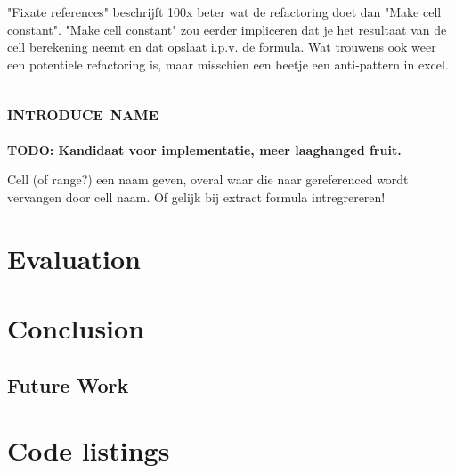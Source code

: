 \documentclass[12pt,a4paper,onecolumn,oneside,parskip]{memoir}
\newcommand{\todo}[1]{\textbf{TODO: #1}}
\newcommand{\rf}[1]{\textsc{\lowercase{#1}}}
\begin{document}
"Fixate references" beschrijft 100x beter wat de refactoring doet dan "Make cell constant". "Make cell constant" zou eerder impliceren dat je het resultaat van de cell berekening neemt en dat opslaat i.p.v. de formula. Wat trouwens ook weer een potentiele refactoring is, maar misschien een beetje een anti-pattern in excel.

\section{\rf{Introduce name}}

\todo{Kandidaat voor implementatie, meer laaghanged fruit.}

Cell (of range?) een naam geven, overal waar die naar gereferenced wordt vervangen door cell naam.
Of gelijk bij extract formula intregrereren!

\chapter{Evaluation}


\chapter{Conclusion}

\section{Future Work}




\appendix

\chapter{Code listings}
\end{document}

